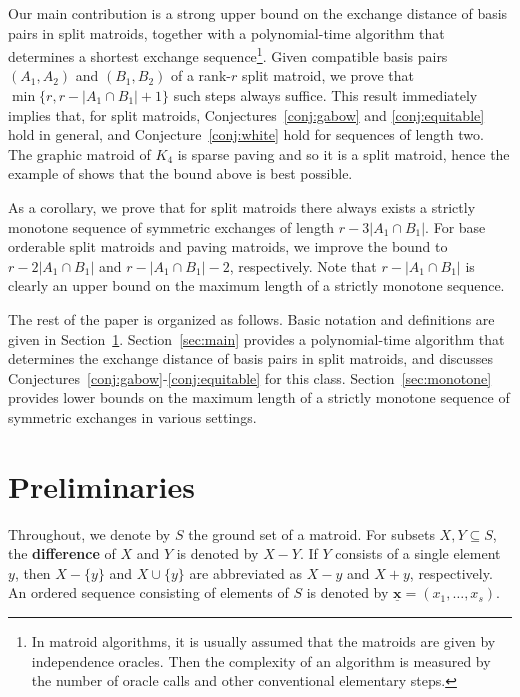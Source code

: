\documentclass[11pt,a4paper]{article}
\theoremstyle{plain}
\theoremstyle{definition}
\newcommand{\ul}[1]{\underline{\mathbf{#1}}}
\begin{document}
Our main contribution is a strong upper bound on the exchange distance of basis pairs in split matroids, together with a polynomial-time algorithm that determines a shortest exchange sequence\footnote{In matroid algorithms, it is usually assumed that the matroids are given by independence oracles. Then the complexity of an algorithm is measured by the number of oracle calls and other conventional elementary steps.}. Given compatible basis pairs $(A_1,A_2)$ and $(B_1,B_2)$ of a rank-$r$ split matroid, we prove that $\min\{r,r-|A_1\cap B_1|+1\}$ such steps always suffice. This result immediately implies that, for split matroids, Conjectures~\ref{conj:gabow} and \ref{conj:equitable} hold in general, and Conjecture~\ref{conj:white} hold for sequences of length two. The graphic matroid of $K_4$ is sparse paving and so it is a split matroid, hence the example of \cite{farber1989basis} shows that the bound above is best possible.

As a corollary, we prove that for split matroids there always exists a strictly monotone sequence of symmetric exchanges of length $r-3|A_1\cap B_1|$. For base orderable split matroids and paving matroids, we improve the bound to $r-2|A_1\cap B_1|$ and $r-|A_1\cap B_1|-2$, respectively. Note that $r-|A_1\cap B_1|$ is clearly an upper bound on the maximum length of a strictly monotone sequence. 

\medskip

The rest of the paper is organized as follows. Basic notation and definitions are given in Section~\ref{sec:pre}. Section~\ref{sec:main} provides a polynomial-time algorithm that determines the exchange distance of basis pairs in split matroids, and discusses Conjectures~\ref{conj:gabow}-\ref{conj:equitable} for this class. Section~\ref{sec:monotone} provides lower bounds on the maximum length of a strictly monotone sequence of symmetric exchanges in various settings.

\section{Preliminaries}
\label{sec:pre}

Throughout, we denote by $S$ the ground set of a matroid. For subsets $X,Y\subseteq S$, 
the \textbf{difference} of $X$ and $Y$ is denoted by $X-Y$. If $Y$ consists of a single element $y$, then $X-\{y\}$ and $X\cup \{y\}$ are abbreviated as $X-y$ and $X+y$, respectively. 
An ordered sequence consisting of elements of $S$ is denoted by $\ul{x}=(x_1,\dots,x_s)$.
\end{document}
